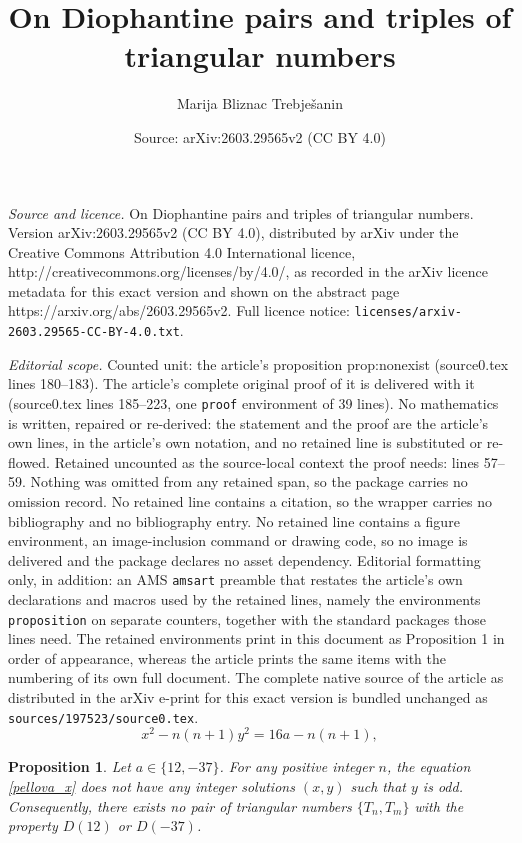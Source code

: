 \documentclass[10pt,a4paper]{amsart}
\title{On Diophantine pairs and triples of triangular numbers}
\author{Marija Bliznac Trebje\v{s}anin}
\date{Source: arXiv:2603.29565v2 (CC BY 4.0)}
\newtheorem{proposition}{Proposition}
\begin{document}
\maketitle

\noindent\emph{Source and licence.} On Diophantine pairs and triples of triangular numbers. Version arXiv:2603.29565v2 (CC BY 4.0), distributed by arXiv under the Creative Commons Attribution 4.0 International licence, http://creativecommons.org/licenses/by/4.0/, as recorded in the arXiv licence metadata for this exact version and shown on the abstract page https://arxiv.org/abs/2603.29565v2. Full licence notice: \texttt{licenses/arxiv-2603.29565-CC-BY-4.0.txt}.\par\smallskip

\noindent\textit{Editorial scope.} Counted unit: the article's proposition prop:nonexist (source0.tex lines 180--183). The article's complete original proof of it is delivered with it (source0.tex lines 185--223, one \texttt{proof} environment of 39 lines). No mathematics is written, repaired or re-derived: the statement and the proof are the article's own lines, in the article's own notation, and no retained line is substituted or re-flowed.  Retained uncounted as the source-local context the proof needs: lines 57--59.  Nothing was omitted from any retained span, so the package carries no omission record.  No retained line contains a citation, so the wrapper carries no bibliography and no bibliography entry.  No retained line contains a figure environment, an image-inclusion command or drawing code, so no image is delivered and the package declares no asset dependency.  Editorial formatting only, in addition: an AMS \texttt{amsart} preamble that restates the article's own declarations and macros used by the retained lines, namely the environments \texttt{proposition} on separate counters, together with the standard packages those lines need.  The retained environments print in this document as Proposition 1 in order of appearance, whereas the article prints the same items with the numbering of its own full document.  The complete native source of the article as distributed in the arXiv e-print for this exact version is bundled unchanged as \texttt{sources/197523/source0.tex}.
\begin{equation}\label{pellova_x}
    x^2-n(n+1)y^2=16a-n(n+1),
\end{equation}

\begin{proposition} \label{prop:nonexist}
Let $a \in \{12, -37\}$. For any positive integer $n$, the equation \eqref{pellova_x}
does not have any integer solutions $(x, y)$ such that $y$ is odd. Consequently, there exists no pair of triangular numbers $\{T_n, T_m\}$ with the property $D(12)$ or $D(-37)$.
\end{proposition}
\end{document}
